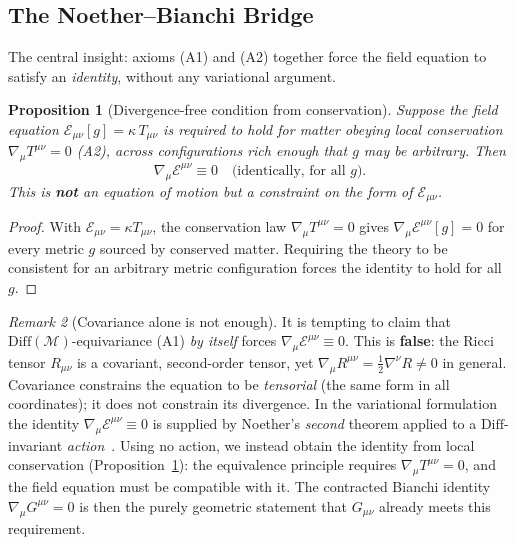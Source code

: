 \documentclass[11pt,twocolumn]{article}
\theoremstyle{plain}\newtheorem{theorem}{Theorem}\newtheorem{proposition}[theorem]{Proposition}\newtheorem{corollary}[theorem]{Corollary}\newtheorem{lemma}[theorem]{Lemma}
\theoremstyle{definition}\newtheorem{definition}[theorem]{Definition}
\theoremstyle{remark}\newtheorem{remark}[theorem]{Remark}
\newcommand{\Diff}{\mathrm{Diff}}
\begin{document}
\subsection{The Noether--Bianchi Bridge}

The central insight: axioms (A1) and (A2) together force the field equation to satisfy an \emph{identity}, without any variational argument.

\begin{proposition}[Divergence-free condition from conservation]\label{thm:noether2}
Suppose the field equation $\mathcal{E}_{\mu\nu}[g] = \kappa\, T_{\mu\nu}$ is required to hold for matter obeying local conservation $\nabla_\mu T^{\mu\nu} = 0$ (A2), across configurations rich enough that $g$ may be arbitrary. Then
\begin{equation}
\boxed{\nabla_\mu \mathcal{E}^{\mu\nu} \equiv 0 \quad \text{(identically, for all $g$)}.}
\end{equation}
This is \textbf{not} an equation of motion but a constraint on the \emph{form} of $\mathcal{E}_{\mu\nu}$.
\end{proposition}

\begin{proof}
With $\mathcal{E}_{\mu\nu} = \kappa T_{\mu\nu}$, the conservation law $\nabla_\mu T^{\mu\nu} = 0$ gives $\nabla_\mu\mathcal{E}^{\mu\nu}[g] = 0$ for every metric $g$ sourced by conserved matter. Requiring the theory to be consistent for an arbitrary metric configuration forces the identity to hold for all $g$.
\end{proof}

\begin{remark}[Covariance alone is not enough]\label{rem:cov-not-enough}
It is tempting to claim that $\Diff(\mathcal{M})$-equivariance (A1) \emph{by itself} forces $\nabla_\mu\mathcal{E}^{\mu\nu}\equiv0$. This is \textbf{false}: the Ricci tensor $R_{\mu\nu}$ is a covariant, second-order tensor, yet $\nabla_\mu R^{\mu\nu} = \tfrac12\nabla^\nu R \neq 0$ in general. Covariance constrains the equation to be \emph{tensorial} (the same form in all coordinates); it does not constrain its divergence. In the variational formulation the identity $\nabla_\mu\mathcal{E}^{\mu\nu}\equiv0$ is supplied by Noether's \emph{second} theorem applied to a $\Diff$-invariant \emph{action}~\cite{noether1918}. Using no action, we instead obtain the identity from local conservation (Proposition~\ref{thm:noether2}): the equivalence principle requires $\nabla_\mu T^{\mu\nu}=0$, and the field equation must be compatible with it. The contracted Bianchi identity $\nabla_\mu G^{\mu\nu}=0$ is then the purely geometric statement that $G_{\mu\nu}$ already meets this requirement.
\end{remark}
\end{document}
